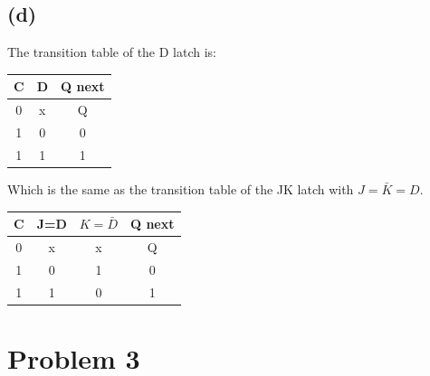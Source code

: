 \documentclass[12pt]{article}
\begin{document}
\subsection*{(d)}
The transition table of  the D latch is:
\begin{center}
    \begin{tabular}{|c|c||c|}
        C & D & Q next \\
        \hline
        0 & x & Q \\
        \hline
        1 & 0 & 0 \\
        \hline
        1 & 1 & 1 \\
        \hline
    \end{tabular}
\end{center}
Which is the same as the transition table of the JK latch with $J=\bar{K}=D$.
\begin{center}
    \begin{tabular}{|c|c|c||c|}
        C & J=D & $K=\bar{D}$ & Q next \\
        \hline
        0 & x & x & Q \\
        \hline
        1 & 0 & 1& 0 \\
        \hline
        1 & 1 & 0 & 1 \\
        \hline
    \end{tabular}
\end{center}

\section*{Problem 3}
\end{document}

